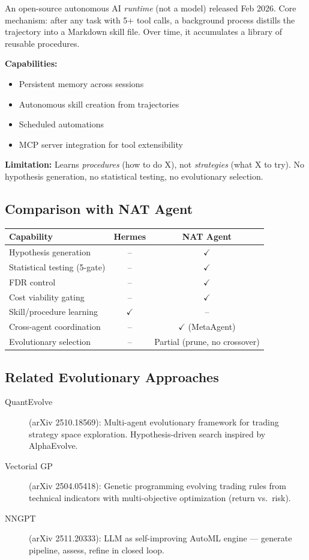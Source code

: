 \documentclass[11pt,a4paper]{article}
\begin{document}
An open-source autonomous AI \textit{runtime} (not a model) released Feb 2026. Core mechanism: after any task with 5+ tool calls, a background process distills the trajectory into a Markdown skill file. Over time, it accumulates a library of reusable procedures.

\textbf{Capabilities:}
\begin{itemize}
    \item Persistent memory across sessions
    \item Autonomous skill creation from trajectories
    \item Scheduled automations
    \item MCP server integration for tool extensibility
\end{itemize}

\textbf{Limitation:} Learns \textit{procedures} (how to do X), not \textit{strategies} (what X to try). No hypothesis generation, no statistical testing, no evolutionary selection.

\subsection{Comparison with NAT Agent}

\begin{center}
\begin{tabular}{l c c}
\hline
\textbf{Capability} & \textbf{Hermes} & \textbf{NAT Agent} \\
\hline
Hypothesis generation & -- & $\checkmark$ \\
Statistical testing (5-gate) & -- & $\checkmark$ \\
FDR control & -- & $\checkmark$ \\
Cost viability gating & -- & $\checkmark$ \\
Skill/procedure learning & $\checkmark$ & -- \\
Cross-agent coordination & -- & $\checkmark$ (MetaAgent) \\
Evolutionary selection & -- & Partial (prune, no crossover) \\
\hline
\end{tabular}
\end{center}

\subsection{Related Evolutionary Approaches}

\begin{description}
    \item[QuantEvolve] (arXiv 2510.18569): Multi-agent evolutionary framework for trading strategy space exploration. Hypothesis-driven search inspired by AlphaEvolve.
    \item[Vectorial GP] (arXiv 2504.05418): Genetic programming evolving trading rules from technical indicators with multi-objective optimization (return vs.\ risk).
    \item[NNGPT] (arXiv 2511.20333): LLM as self-improving AutoML engine --- generate pipeline, assess, refine in closed loop.
\end{description}
\end{document}
